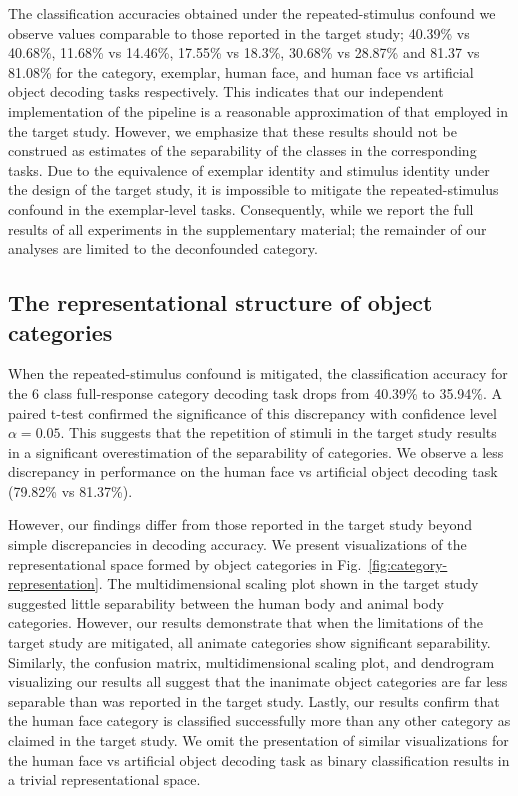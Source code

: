 The classification accuracies obtained under the repeated-stimulus confound we observe values comparable to those reported in the target study; 40.39\% vs 40.68\%, 11.68\% vs 14.46\%, 17.55\% vs 18.3\%, 30.68\% vs 28.87\% and 81.37 vs 81.08\% for the category, exemplar, human face, and human face vs artificial object decoding tasks respectively. This indicates that our independent implementation of the pipeline is a reasonable approximation of that employed in the target study. However, we emphasize that these results should not be construed as estimates of the separability of the classes in the corresponding tasks. Due to the equivalence of exemplar identity and stimulus identity under the design of the target study, it is impossible to mitigate the repeated-stimulus confound in the exemplar-level tasks. Consequently, while we report the full results of all experiments in the supplementary material; the remainder of our analyses are limited to the deconfounded category.

\subsection{The representational structure of object categories}
When the repeated-stimulus confound is mitigated, the classification accuracy for the 6 class full-response category decoding task drops from 40.39\% to 35.94\%. A paired t-test confirmed the significance of this discrepancy with confidence level \(\alpha=0.05\). This suggests that the repetition of stimuli in the target study results in a significant overestimation of the separability of categories. We observe a less discrepancy in performance on the human face vs artificial object decoding task (79.82\% vs 81.37\%). 

However, our findings differ from those reported in the target study beyond simple discrepancies in decoding accuracy. We present visualizations of the representational space formed by object categories in Fig.~\ref{fig:category-representation}. The multidimensional scaling plot shown in the target study suggested little separability between the human body and animal body categories. However, our results demonstrate that when the limitations of the target study are mitigated, all animate categories show significant separability. Similarly, the confusion matrix, multidimensional scaling plot, and dendrogram visualizing our results all suggest that the inanimate object categories are far less separable than was reported in the target study. Lastly, our results confirm that the human face category is classified successfully more than any other category as claimed in the target study. We omit the presentation of similar visualizations for the human face vs artificial object decoding task as binary classification results in a trivial representational space.

